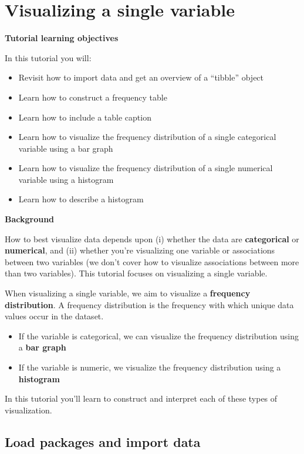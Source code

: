 \documentclass[
]{book}
\providecommand{\tightlist}{%
  \setlength{\itemsep}{0pt}\setlength{\parskip}{0pt}}
\begin{document}
\chapter{Visualizing a single variable}\label{vis_variable}

\textbf{Tutorial learning objectives}

In this tutorial you will:

\begin{itemize}
\tightlist
\item
  Revisit how to import data and get an overview of a ``tibble'' object
\item
  Learn how to construct a frequency table
\item
  Learn how to include a table caption
\item
  Learn how to visualize the frequency distribution of a single categorical variable using a bar graph
\item
  Learn how to visualize the frequency distribution of a single numerical variable using a histogram
\item
  Learn how to describe a histogram
\end{itemize}

\textbf{Background}

How to best visualize data depends upon (i) whether the data are \textbf{categorical} or \textbf{numerical}, and (ii) whether you're visualizing one variable or associations between two variables (we don't cover how to visualize associations between more than two variables). This tutorial focuses on visualizing a single variable.

When visualizing a single variable, we aim to visualize a \textbf{frequency distribution}. A frequency distribution is the frequency with which unique data values occur in the dataset.

\begin{itemize}
\tightlist
\item
  If the variable is categorical, we can visualize the frequency distribution using a \textbf{bar graph}
\item
  If the variable is numeric, we visualize the frequency distribution using a \textbf{histogram}
\end{itemize}

In this tutorial you'll learn to construct and interpret each of these types of visualization.

\section{Load packages and import data}\label{vis_packages_data}
\end{document}
